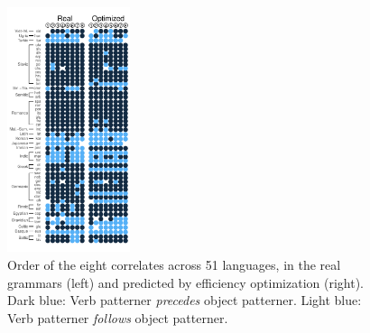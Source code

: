 \documentclass[9pt,twocolumn,twoside,lineno]{pnas-new}
\begin{document}
\begin{figure} %
	\begin{center}
	\includegraphics[width=0.32\textwidth]{../results/correlations/figures/pred-eff-families-2.pdf}
	\end{center}
	\caption{Order of the eight correlates across 51 languages, in the real grammars (left) and predicted by efficiency optimization (right). Dark blue: Verb patterner \emph{precedes} object patterner. Light blue: Verb patterner \emph{follows} object patterner.}\label{fig:per-lang}
\end{figure}
\end{document}
